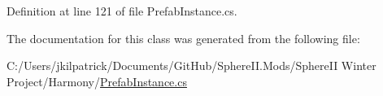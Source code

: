 Definition at line 121 of file Prefab\+Instance.\+cs.



The documentation for this class was generated from the following file\+:\begin{DoxyCompactItemize}
\item 
C\+:/\+Users/jkilpatrick/\+Documents/\+Git\+Hub/\+Sphere\+I\+I.\+Mods/\+Sphere\+I\+I Winter Project/\+Harmony/\mbox{\hyperlink{_prefab_instance_8cs}{Prefab\+Instance.\+cs}}\end{DoxyCompactItemize}
